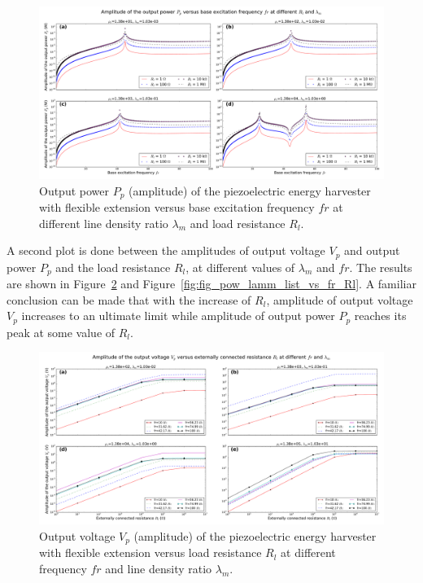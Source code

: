 \documentclass{elsarticle}
\begin{document}
\begin{figure}[!htbp]
    \centering
    \includegraphics[width=\textwidth]{./fig_output_power_vs_fr_Rl_lamm_all}
    \caption{Output power $P_p$ (amplitude) of the piezoelectric energy harvester with flexible extension versus base excitation frequency $fr$ at different line density ratio $\lambda_m$ and load resistance $R_l$.}
    \label{fig:fig_output_power_vs_fr_Rl_lamm_all}
\end{figure}

A second plot is done between the amplitudes of output voltage $V_p$ and output power $P_p$ and the load resistance $R_l$, at different values of $\lambda_m$ and $fr$. The results are shown in Figure~\ref{fig:fig_vol_lamm_list_vs_fr_Rl} and Figure~\ref{fig:fig_pow_lamm_list_vs_fr_Rl}. A familiar conclusion can be made that with the increase of $R_l$, amplitude of output voltage $V_p$ increases to an ultimate limit while amplitude of output power $P_p$ reaches its peak at some value of $R_l$.


\begin{figure}[!htbp]
    \centering
    \includegraphics[width=\textwidth]{./fig_vol_lamm_list_vs_fr_Rl}
    \caption{Output voltage $V_p$ (amplitude) of the piezoelectric energy harvester with flexible extension versus load resistance $R_l$ at different frequency $fr$ and line density ratio $\lambda_m$. }
    \label{fig:fig_vol_lamm_list_vs_fr_Rl}
\end{figure}
\end{document}
